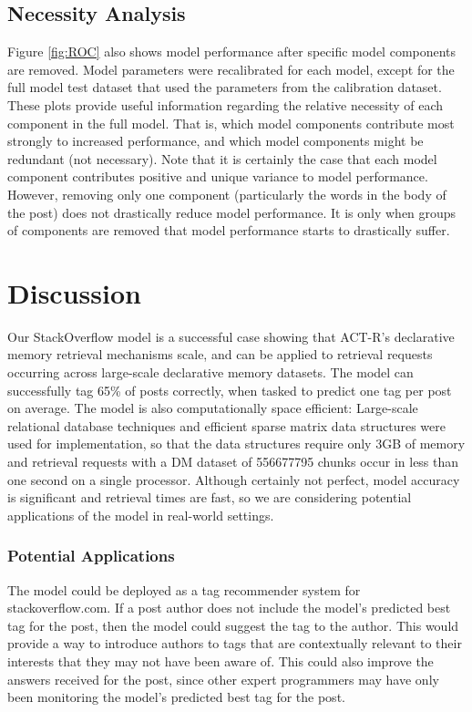 \documentclass[10pt,letterpaper]{article}
\begin{document}
\subsection{Necessity Analysis}

Figure \ref{fig:ROC} also shows model performance after specific model components are removed.
Model parameters were recalibrated for each model, except for the full model test dataset that used the parameters from the calibration dataset.
These plots provide useful information regarding the relative necessity of each component in the full model.
That is, which model components contribute most strongly to increased performance, and which model components might be redundant (not necessary).
Note that it is certainly the case that each model component contributes positive and unique variance to model performance.
However, removing only one component (particularly the words in the body of the post) does not drastically reduce model performance.
It is only when groups of components are removed that model performance starts to drastically suffer.

\section{Discussion}

Our StackOverflow model is a successful case showing that ACT-R's declarative memory retrieval mechanisms scale, and can be applied to retrieval requests occurring across large-scale declarative memory datasets. 
The model can successfully tag 65\% of posts correctly, when tasked to predict one tag per post on average.
The model is also computationally space efficient:
Large-scale relational database techniques and efficient sparse matrix data structures were used for implementation,
so that the data structures require only 3GB of memory and retrieval requests with a DM dataset of \num{556677795} chunks occur in less than one second on a single processor.
Although certainly not perfect, model accuracy is significant and retrieval times are fast, so we are considering potential applications of the model in real-world settings.

\subsubsection{Potential Applications}

The model could be deployed as a tag recommender system for stackoverflow.com. 
If a post author does not include the model's predicted best tag for the post, then the model could suggest the tag to the author.
This would provide a way to introduce authors to tags that are contextually relevant to their interests that they may not have been aware of.
This could also improve the answers received for the post, since other expert programmers may have only been monitoring the model's predicted best tag for the post.
\end{document}
